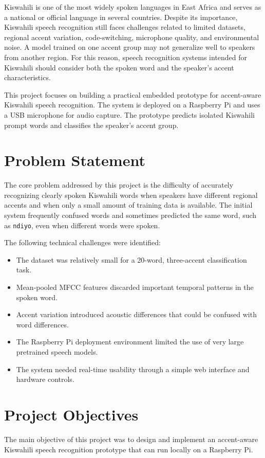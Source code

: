 \documentclass[12pt,a4paper]{report}
\begin{document}
Kiswahili is one of the most widely spoken languages in East Africa and serves as a national or official language in several countries. Despite its importance, Kiswahili speech recognition still faces challenges related to limited datasets, regional accent variation, code-switching, microphone quality, and environmental noise. A model trained on one accent group may not generalize well to speakers from another region. For this reason, speech recognition systems intended for Kiswahili should consider both the spoken word and the speaker's accent characteristics.

This project focuses on building a practical embedded prototype for accent-aware Kiswahili speech recognition. The system is deployed on a Raspberry Pi and uses a USB microphone for audio capture. The prototype predicts isolated Kiswahili prompt words and classifies the speaker's accent group.

\section{Problem Statement}
The core problem addressed by this project is the difficulty of accurately recognizing clearly spoken Kiswahili words when speakers have different regional accents and when only a small amount of training data is available. The initial system frequently confused words and sometimes predicted the same word, such as \texttt{ndiyo}, even when different words were spoken.

The following technical challenges were identified:

\begin{itemize}
    \item The dataset was relatively small for a 20-word, three-accent classification task.
    \item Mean-pooled MFCC features discarded important temporal patterns in the spoken word.
    \item Accent variation introduced acoustic differences that could be confused with word differences.
    \item The Raspberry Pi deployment environment limited the use of very large pretrained speech models.
    \item The system needed real-time usability through a simple web interface and hardware controls.
\end{itemize}

\section{Project Objectives}
The main objective of this project was to design and implement an accent-aware Kiswahili speech recognition prototype that can run locally on a Raspberry Pi.
\end{document}
